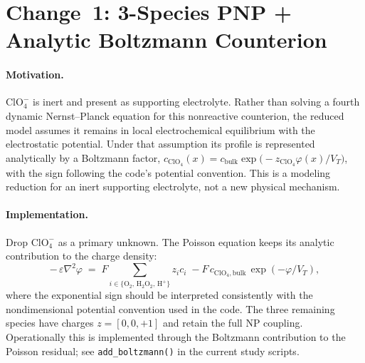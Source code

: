 \documentclass[11pt]{article}
\newcommand{\VT}{V_{T}}
\begin{document}
\section{Change~1: 3-Species PNP + Analytic Boltzmann Counterion}
\paragraph{Motivation.}
$\mathrm{ClO}_4^{-}$ is inert and present as supporting electrolyte. Rather
than solving a fourth dynamic Nernst--Planck equation for this nonreactive
counterion, the reduced model assumes it remains in local electrochemical
equilibrium with the electrostatic potential. Under that assumption its
profile is represented analytically by a Boltzmann factor,
\(
  c_{\mathrm{ClO}_4}(x) = c_{\mathrm{bulk}}\exp\!\bigl(-z_{\mathrm{ClO}_4}\varphi(x)/\VT\bigr)
\),
with the sign following the code's potential convention. This is a modeling
reduction for an inert supporting electrolyte, not a new physical mechanism.

\paragraph{Implementation.}
Drop $\mathrm{ClO}_4^{-}$ as a primary unknown. The Poisson equation keeps its
analytic contribution to the charge density:
\begin{equation}
  -\,\varepsilon\nabla^{2}\varphi
   \;=\; F\!\!\sum_{i\in\{\mathrm{O}_2,\,\mathrm{H}_2\mathrm{O}_2,\,\mathrm{H}^{+}\}} z_i c_i
   \;-
   F\,c_{\mathrm{ClO}_4,\mathrm{bulk}}\,\exp(-\varphi/\VT),
\end{equation}
where the exponential sign should be interpreted consistently with the
nondimensional potential convention used in the code. The three remaining
species have charges $z = [0,0,+1]$ and retain the full NP coupling.
Operationally this is implemented through the Boltzmann contribution to the
Poisson residual; see \texttt{add\_boltzmann()} in the current study scripts.
\end{document}
